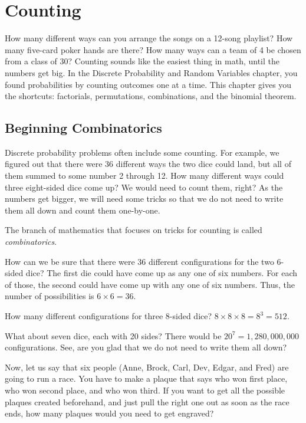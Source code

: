 \chapter{Counting}

How many different ways can you arrange the songs on a 12-song playlist? How many five-card poker hands are
there? How many ways can a team of 4 be chosen from a class of 30? Counting sounds like the easiest thing in
math, until the numbers get big. In the Discrete Probability and Random Variables chapter, you found
probabilities by counting outcomes one at a time. This chapter gives you the shortcuts: factorials,
permutations, combinations, and the binomial theorem.

\section{Beginning Combinatorics}
Discrete probability problems often include some counting. For
example, we figured out that there were 36 different ways the two dice could land, 
but all of them summed to some number 2 through 12. How
many different ways could three eight-sided dice come up? We would need to
count them, right? As the numbers get bigger, we will need some tricks so that
we do not need to write them all down and count them one-by-one.

The branch of mathematics that focuses on tricks for counting is
called \textit{combinatorics}.

How can we be sure that there were 36 different configurations for the
two 6-sided dice? The first die could have come up as any one of six
numbers. For each of those, the second could have come up with any one
of six numbers. Thus, the number of possibilities is $ 6 \times 6 =
36.$

How many different configurations for three 8-sided dice?  $8 \times 8
\times 8 = 8^3 = 512$.

What about seven dice, each with 20 sides? There would be $20^7=1,280,000,000$
configurations. See, are you glad that we do not need to write them all down?

Now, let us say that six people (Anne, Brock, Carl, Dev, Edgar, and Fred) are
going to run a race. You have to make a plaque that says who won first
place, who won second place, and who won third. If you want to get all
the possible plaques created beforehand, and just pull the right one
out as soon as the race ends, how many plaques would you need to get
engraved?

